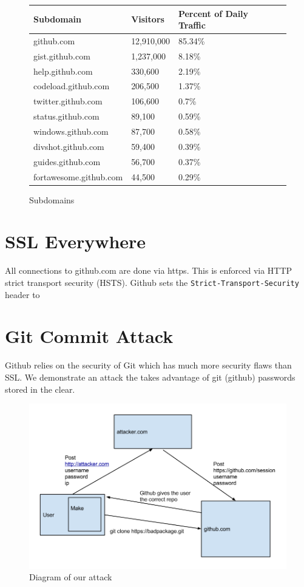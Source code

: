 \documentclass{lposter}
\theoremstyle{plain}
\theoremstyle{definition}
\renewcommand{\tt}[1]{\texttt{#1}}
\begin{document}
\begin{poster}
\begin{figure}
\begin{table}
\begin{tabular}{| l | l | l | l | l | }
Subdomain & Visitors & Percent of Daily Traffic \\ \hline
github.com & 12,910,000 & 85.34\% \\ \hline
gist.github.com & 1,237,000 & 8.18\%  \\ \hline
help.github.com & 330,600 & 2.19\%  \\ \hline
codeload.github.com & 206,500 & 1.37\%  \\ \hline
twitter.github.com & 106,600 & 0.7\%  \\ \hline
status.github.com & 89,100 & 0.59\%  \\ \hline
windows.github.com & 87,700 & 0.58\%  \\ \hline
divshot.github.com & 59,400 & 0.39\%  \\ \hline
guides.github.com & 56,700 & 0.37\%  \\ \hline
fortawesome.github.com & 44,500 & 0.29\%  \\ \hline
\end{tabular}
\end{table}
\caption{Subdomains\newline}
\label{fig:mig_over}
\end{figure}


\section{SSL Everywhere}

All connections to github.com are done via https. This is enforced via HTTP strict transport security (HSTS). Github sets the \tt{Strict-Transport-Security} header to \tt{}


\section{Git Commit Attack}
Github relies on the security of Git which has much more security flaws than SSL. We demonstrate an attack the takes advantage of git (github) passwords stored in the clear.

\begin{figure}
\centering
\includegraphics[scale=.7]{attack.png}
\caption{Diagram of our attack\newline}
\label{fig:mig_over}
\end{figure}


\end{poster}
\end{document}

